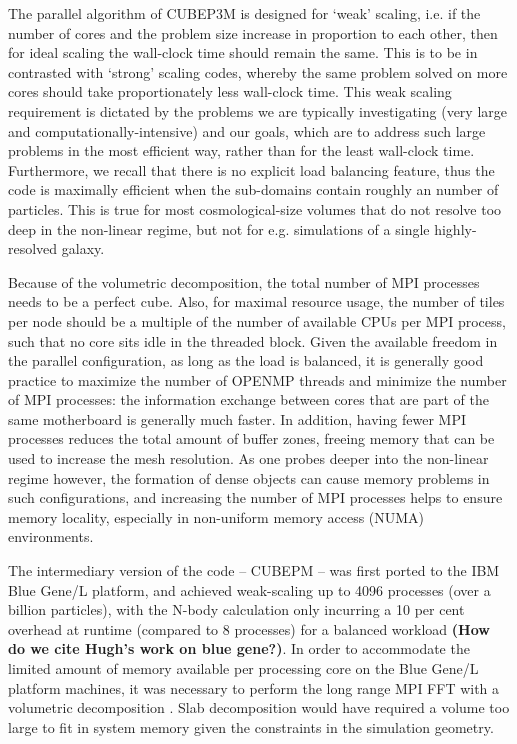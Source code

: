 The parallel algorithm of {\small CUBEP3M} is designed for `weak' 
scaling, i.e. if the number of cores and the problem size 
increase in proportion to each other, then for ideal scaling the 
wall-clock time should remain the same. This is to be in contrasted with `strong' 
scaling codes, whereby the same problem solved on more cores should take 
proportionately less wall-clock time. This weak scaling requirement 
is dictated by the problems we are typically investigating (very 
large and computationally-intensive) and our goals, which are to 
address such large problems in the most efficient way, rather than 
for the least wall-clock time. Furthermore, we recall that there is no explicit 
load balancing feature, thus the code is maximally efficient when the sub-domains
contain roughly an  number of particles. This is true for most
cosmological-size volumes that do not resolve too deep in the non-linear regime, 
but not for e.g. simulations of a single highly-resolved galaxy. 

Because of the volumetric decomposition, the total number of {\small MPI} processes needs
to be a perfect cube. Also, for maximal resource usage, the number of tiles per node 
should be a multiple of the number of available {\small CPU}s per {\small MPI} process,
such that no core sits idle in the threaded block.
Given the available freedom in the parallel configuration, as long as the load is balanced, it is generally good practice to maximize the number of {\small OPENMP} threads and minimize the number of {\small MPI} processes:
the information exchange between cores that are part of the same motherboard is generally much faster.
In addition, having fewer {\small MPI} processes reduces the total amount of buffer zones, 
freeing memory that can be used to increase the mesh resolution. 
As one probes deeper into the non-linear regime however, 
the formation of dense objects can cause memory problems in such configurations, and increasing 
the number of {\small MPI} processes helps to ensure memory locality,
especially in non-uniform memory access (NUMA) environments.




 The intermediary version of the code -- {\small CUBEPM} --
was first  ported to the IBM Blue Gene/L platform, and achieved 
weak-scaling up to 4096 processes (over a billion particles), with the N-body calculation only incurring a 10 per cent overhead 
at runtime (compared to 8 processes) for a balanced workload {\bf (How do we cite Hugh's work on blue gene?)}.  In order to 
accommodate the limited amount of memory available per processing core on the 
Blue Gene/L platform machines, it was necessary to perform the long range {\small MPI FFT}
with a volumetric decomposition \citep{3DFFT}.
Slab decomposition would have required a volume too large to fit in system 
memory given the constraints in the simulation geometry. 

